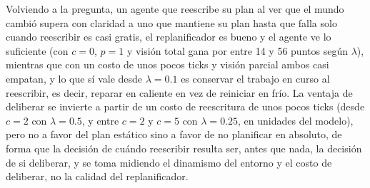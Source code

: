 Volviendo a la pregunta, un agente que reescribe su plan al ver que el mundo cambió supera con claridad a uno que mantiene su plan hasta que falla solo cuando reescribir es casi gratis, el replanificador es bueno y el agente ve lo suficiente (con $c=0$, $p=1$ y visión total gana por entre 14 y 56 puntos según $\lambda$), mientras que con un costo de unos pocos ticks y visión parcial ambos casi empatan, y lo que sí vale desde $\lambda=0.1$ es conservar el trabajo en curso al reescribir, es decir, reparar en caliente en vez de reiniciar en frío. La ventaja de deliberar se invierte a partir de un costo de reescritura de unos pocos ticks (desde $c=2$ con $\lambda=0.5$, y entre $c=2$ y $c=5$ con $\lambda=0.25$, en unidades del modelo), pero no a favor del plan estático sino a favor de no planificar en absoluto, de forma que la decisión de cuándo reescribir resulta ser, antes que nada, la decisión de si deliberar, y se toma midiendo el dinamismo del entorno y el costo de deliberar, no la calidad del replanificador.
